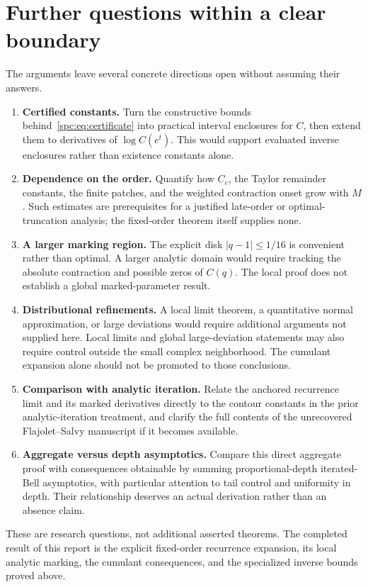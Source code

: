 \documentclass[11pt,letterpaper]{article}
\theoremstyle{definition}\newtheorem{definition}[theorem]{Definition}
\theoremstyle{remark}\newtheorem{remark}[theorem]{Remark}
\begin{document}
\section{Further questions within a clear boundary}\label{spc:sec:questions}
The arguments leave several concrete directions open without assuming their answers.
\begin{enumerate}
\item \textbf{Certified constants.} Turn the constructive bounds behind~\eqref{spc:eq:certificate} into practical interval enclosures for $C$, then extend them to derivatives of $\log C(e^t)$. This would support evaluated inverse enclosures rather than existence constants alone.
\item \textbf{Dependence on the order.} Quantify how $C_e$, the Taylor remainder constants, the finite patches, and the weighted contraction onset grow with $M$. Such estimates are prerequisites for a justified late-order or optimal-truncation analysis; the fixed-order theorem itself supplies none.
\item \textbf{A larger marking region.} The explicit disk $|q-1|\le1/16$ is convenient rather than optimal. A larger analytic domain would require tracking the absolute contraction and possible zeros of $C(q)$. The local proof does not establish a global marked-parameter result.
\item \textbf{Distributional refinements.} A local limit theorem, a quantitative normal approximation, or large deviations would require additional arguments not supplied here. Local limits and global large-deviation statements may also require control outside the small complex neighborhood. The cumulant expansion alone should not be promoted to those conclusions.
\item \textbf{Comparison with analytic iteration.} Relate the anchored recurrence limit and its marked derivatives directly to the contour constants in the prior analytic-iteration treatment, and clarify the full contents of the unrecovered Flajolet--Salvy manuscript if it becomes available.
\item \textbf{Aggregate versus depth asymptotics.} Compare this direct aggregate proof with consequences obtainable by summing proportional-depth iterated-Bell asymptotics, with particular attention to tail control and uniformity in depth. Their relationship deserves an actual derivation rather than an absence claim.
\end{enumerate}
These are research questions, not additional asserted theorems. The completed result of this report is the explicit fixed-order recurrence expansion, its local analytic marking, the cumulant consequences, and the specialized inverse bounds proved above.
\end{document}
